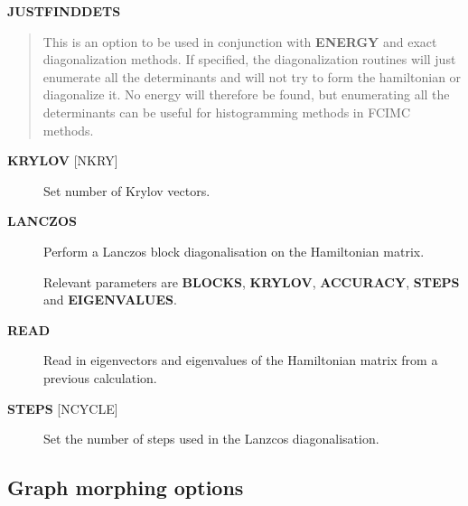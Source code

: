 \documentclass[openany,a4paper,10pt]{manual}
\begin{document}
\textbf{JUSTFINDDETS}
\begin{quote}

This is an option to be used in conjunction with \textbf{ENERGY} and exact diagonalization methods.
If specified, the diagonalization routines will just enumerate all the determinants and will
not try to form the hamiltonian or diagonalize it. No energy will therefore be found, but
enumerating all the determinants can be useful for histogramming methods in FCIMC methods.
\end{quote}
\begin{description}
\item[\textbf{KRYLOV} {[}NKRY{]}]
Set number of Krylov vectors.

\item[\textbf{LANCZOS}]
Perform a Lanczos block diagonalisation on the Hamiltonian matrix.

Relevant parameters are \textbf{BLOCKS}, \textbf{KRYLOV}, \textbf{ACCURACY},
\textbf{STEPS} and \textbf{EIGENVALUES}.

\item[\textbf{READ}]
Read in eigenvectors and eigenvalues of the Hamiltonian matrix from a previous calculation.

\item[\textbf{STEPS} {[}NCYCLE{]}]
Set the number of steps used in the Lanzcos diagonalisation.

\end{description}


\subsection{Graph morphing options}
\end{document}
